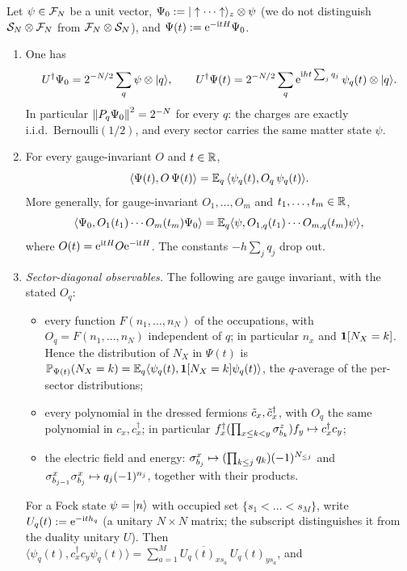 \begin{corollary}\label{cor:sector}
Let $\psi\in\mathcal{F}_N$ be a unit vector, $\Psi_0:=|\uparrow\cdots\uparrow\rangle_z\otimes\psi$ (we do not
distinguish $\mathcal{S}_N\otimes\mathcal{F}_N$ from $\mathcal{F}_N\otimes\mathcal{S}_N$), and $\Psi(t):=\mathrm{e}^{-\mathrm{i} tH}\Psi_0$.
\begin{enumerate}[label=(\alph*)]
\item One has
\[
  U^\dagger\Psi_0=2^{-N/2}\sum_q\psi\otimes|q\rangle,\qquad
  U^\dagger\Psi(t)=2^{-N/2}\sum_q\mathrm{e}^{\mathrm{i} ht\sum_jq_j}\,\psi_q(t)\otimes|q\rangle.
\]
In particular $\left\|P_q\Psi_0\right\|^2=2^{-N}$ for every $q$: the charges are exactly i.i.d.\
Bernoulli$(1/2)$, and every sector carries the same matter state $\psi$.
\item For every gauge-invariant $O$ and $t\in\mathbb{R}$,
\begin{equation}\label{eq:sectoravg}
  \langle\Psi(t),O\,\Psi(t)\rangle=\mathbb{E}_q\,\langle\psi_q(t),O_q\,\psi_q(t)\rangle .
\end{equation}
More generally, for gauge-invariant $O_1,\dots,O_m$ and $t_1,\dots,t_m\in\mathbb{R}$,
\[
  \langle\Psi_0,O_1(t_1)\cdots O_m(t_m)\Psi_0\rangle=\mathbb{E}_q\langle\psi,O_{1,q}(t_1)\cdots O_{m,q}(t_m)\psi\rangle,
\]
where $O(t)=\mathrm{e}^{\mathrm{i} tH}O\mathrm{e}^{-\mathrm{i} tH}$.  The constants $-h\sum_jq_j$ drop out.
\item \emph{Sector-diagonal observables.}  The following are gauge invariant, with the stated $O_q$:
\begin{itemize}
\item every function $F(n_1,\dots,n_N)$ of the occupations, with $O_q=F(n_1,\dots,n_N)$
independent of $q$; in particular $n_x$ and $\mathbf{1}[N_X=k]$.  Hence the distribution of $N_X$ in
$\Psi(t)$ is $\mathbb{P}_{\Psi(t)}(N_X=k)=\mathbb{E}_q\langle\psi_q(t),\mathbf{1}[N_X=k]\psi_q(t)\rangle$, the
$q$-average of the per-sector distributions;
\item every polynomial in the dressed fermions $\tilde c_x,\tilde c_x^\dagger$, with $O_q$ the same
polynomial in $c_x,c_x^\dagger$; in particular $f_x^\dagger(\prod_{x\le k<y}\sigma^{z}_{b_{k}})f_y\mapsto c_x^\dagger c_y$;
\item the electric field and energy: $\sigma^{x}_{b_{j}}\mapsto(\prod_{k\le j}q_k)(-1)^{N_{\le j}}$ and
$\sigma^{x}_{b_{j-1}}\sigma^{x}_{b_{j}}\mapsto q_j(-1)^{n_j}$, together with their products.
\end{itemize}
For a Fock state $\psi=|n\rangle$ with occupied set $\{s_1<\dots<s_M\}$, write $U_q(t):=\mathrm{e}^{-\mathrm{i} th_{q}}$ (a unitary $N\times N$ matrix; the subscript distinguishes it from the duality unitary $U$).
Then $\langle\psi_q(t),c_x^\dagger c_y\psi_q(t)\rangle=\sum_{a=1}^M\overline{U_q(t)_{xs_a}}\,U_q(t)_{ys_a}$, and

\end{enumerate}
\end{corollary}
